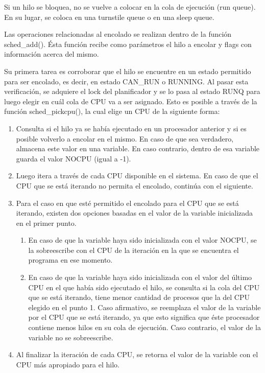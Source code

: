 Si un hilo se bloquea, no se vuelve a colocar en la cola de ejecución (run queue). En su lugar, se coloca en una turnstile queue o en una sleep queue.\par

Las operaciones relacionadas al encolado se realizan dentro de la función sched\_add(). Ésta función recibe como parámetros el hilo a encolar y flags con información acerca del mismo.\par

Su primera tarea es corroborar que el hilo se encuentre en un estado permitido para ser encolado, es decir, en estado CAN\_RUN o RUNNING. Al pasar esta verificación, se adquiere el lock del planificador y se lo pasa al estado RUNQ para luego elegir en cuál cola de CPU va a ser asignado. Esto es posible a través de la función sched\_pickcpu(), la cual elige un CPU de la siguiente forma:

\begin{enumerate}
    \item Consulta si el hilo ya se había ejecutado en un procesador anterior y si es posible volverlo a encolar en el mismo. En caso de que sea verdadero, almacena este valor en una variable. En caso contrario, dentro de esa variable guarda el valor NOCPU (igual a -1).
    \item Luego itera a través de cada CPU disponible en el sistema. En caso de que el CPU que se está iterando no permita el encolado, continúa con el siguiente.
    \item Para el caso en que esté permitido el encolado para el CPU que se está iterando, existen dos opciones basadas en el valor de la variable inicializada en el primer punto.
    \begin{enumerate}
        \item En caso de que la variable haya sido inicializada con el valor NOCPU, se la sobreescribe con el CPU de la iteración en la que se encuentra el programa en ese momento.
        \item En caso de que la variable haya sido inicializada con el valor del último CPU en el que había sido ejecutado el hilo, se consulta si la cola del CPU que se está iterando, tiene menor cantidad de procesos que la del CPU elegido en el punto 1. Caso afirmativo, se reemplaza el valor de la variable por el CPU que se está iterando, ya que esto significa que éste procesador contiene menos hilos en su cola de ejecución. Caso contrario, el valor de la variable no se sobreescribe.
    \end{enumerate}
    \item Al finalizar la iteración de cada CPU, se retorna el valor de la variable con el CPU más apropiado para el hilo.
\end{enumerate}

